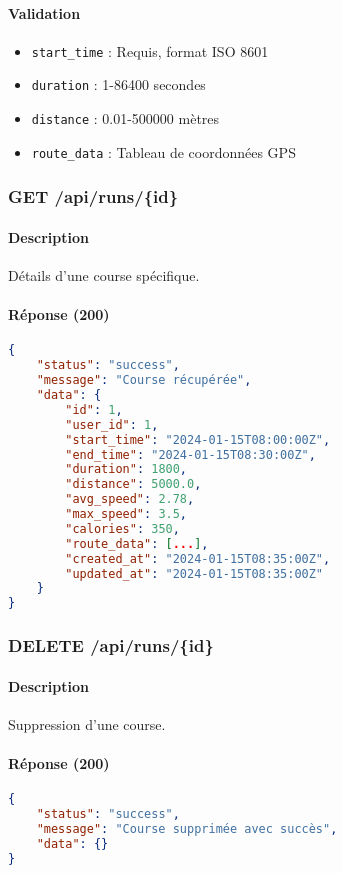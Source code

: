 \paragraph{Validation}
\begin{itemize}
    \item \texttt{start\_time} : Requis, format ISO 8601
    \item \texttt{duration} : 1-86400 secondes
    \item \texttt{distance} : 0.01-500000 mètres
    \item \texttt{route\_data} : Tableau de coordonnées GPS
\end{itemize}

\subsubsection{GET /api/runs/\{id\}}

\paragraph{Description}
Détails d'une course spécifique.

\paragraph{Réponse (200)}
\begin{lstlisting}[language=json]
{
    "status": "success",
    "message": "Course récupérée",
    "data": {
        "id": 1,
        "user_id": 1,
        "start_time": "2024-01-15T08:00:00Z",
        "end_time": "2024-01-15T08:30:00Z",
        "duration": 1800,
        "distance": 5000.0,
        "avg_speed": 2.78,
        "max_speed": 3.5,
        "calories": 350,
        "route_data": [...],
        "created_at": "2024-01-15T08:35:00Z",
        "updated_at": "2024-01-15T08:35:00Z"
    }
}
\end{lstlisting}

\subsubsection{DELETE /api/runs/\{id\}}

\paragraph{Description}
Suppression d'une course.

\paragraph{Réponse (200)}
\begin{lstlisting}[language=json]
{
    "status": "success",
    "message": "Course supprimée avec succès",
    "data": {}
}
\end{lstlisting}

